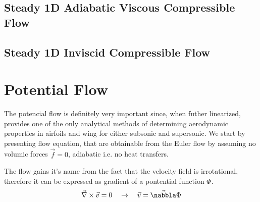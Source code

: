 






\newpage
\subsection{Steady 1D Adiabatic Viscous Compressible Flow}

\newpage
\subsection{Steady 1D Inviscid Compressible Flow}




\newpage
\section{Potential Flow}
The potencial flow is definitely very important since, when futher linearized, provides one of the only analytical methods of determining aerodynamic properties in airfoils and wing for either subsonic and supersonic.
We start by presenting flow equation, that are obtainable from the Euler flow by assuming no volumic forces $\vec{f}=0$, adiabatic i.e. no heat transfers. 

The flow gains it's name from the fact that the velocity field is irrotational, therefore it can be expressed as gradient of a pontential function $\Phi$.
\begin{eqnarray}        
    \vec{\nabla}\times \vec{v} = 0   \quad \rightarrow \quad  \vec{v} = \vec{\nabbla} \Phi  
\end{eqnarray}        

